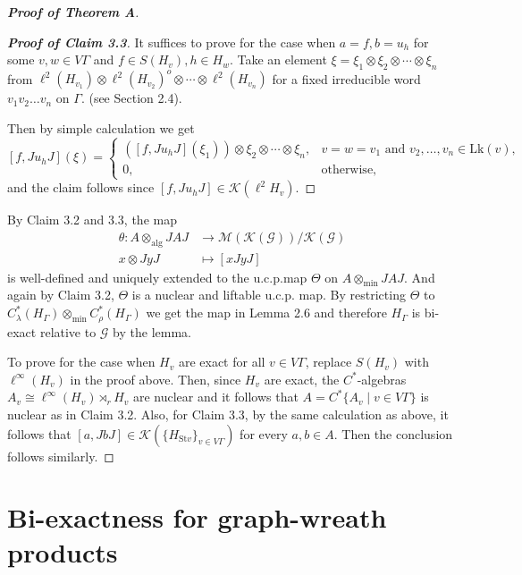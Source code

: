\documentclass{amsart}
\theoremstyle{definition}
\newcommand{\Cstaralgs}{$C^{\ast}$-algebras\xspace}
\newcommand{\mintensor}{\otimes_{\mathrm{min}}}
\newcommand{\algtensor}{\otimes_{\mathrm{alg}}}
\begin{document}
\begin{proof}[\textbf{Proof of Theorem A}]
\begin{proof}[\textbf{Proof of Claim 3.3}]
It suffices to prove for the case when $a=f, b=u_h$
for some $v,w\in V\Gamma$ and $f\in S(H_v), h\in H_w$. 
Take an element $\xi = \xi_1\otimes\xi_2\otimes \cdots\otimes \xi_n$ from $\ell^2(H_{v_1})\otimes \ell^2(H_{v_2})^o \otimes \cdots\otimes \ell^2(H_{v_n})$ for a fixed irreducible word $v_1v_2\ldots v_n$ on $\Gamma$. (see Section 2.4). 

Then by simple calculation we get
\[
[f,Ju_hJ](\xi)= 
\begin{cases}
([f,Ju_hJ](\xi_1))\otimes \xi_2\otimes\cdots\otimes\xi_n, 
& v=w=v_1 \text{ and } v_2, \ldots, v_n\in \mathrm{Lk}(v), \\
0, & \text{otherwise},
\end{cases}
\]
and the claim follows since $[f,Ju_hJ]\in \mathcal{K}(\ell^2 H_v)$. 
\end{proof}

By Claim 3.2 and 3.3, the map
\begin{align}
\theta : A\algtensor JAJ &\to \mathcal{M}(\mathcal{K}(\mathcal{G}))/\mathcal{K}(\mathcal{G}) \\
x\otimes JyJ &\mapsto [xJyJ]
\end{align}
is well-defined and uniquely extended to the u.c.p.\@ map $\Theta$ on $A\mintensor JAJ$. And again by Claim 3.2, $\Theta$ is a nuclear and liftable u.c.p. map. By restricting $\Theta$ to $C^{\ast}_{\lambda}(H_{\Gamma})\mintensor C^{\ast}_{\rho}(H_{\Gamma})$ we get the map in Lemma 2.6 and therefore $H_{\Gamma}$ is bi-exact relative to $\mathcal{G}$ by the lemma. 

To prove for the case when $H_v$ are exact for all $v\in V\Gamma$, replace $S(H_v)$ with $\ell^{\infty}(H_v)$ in the proof above. 
Then, since $H_v$ are exact, the \Cstaralgs $A_v\cong \ell^{\infty}(H_v)\rtimes_r H_v$ are nuclear and it follows that $A=C^{\ast}\{A_v\mid v\in V\Gamma\}$ is nuclear as in Claim 3.2. Also, for Claim 3.3, 
by the same calculation as above, it follows that $[a, JbJ]\in \mathcal{K}(\{ H_{\mathrm{St}v}\}_{v\in V\Gamma})$
for every $a,b\in A$. 
Then the conclusion follows similarly. 
\end{proof}














\section{Bi-exactness for graph-wreath products}
\end{document}

